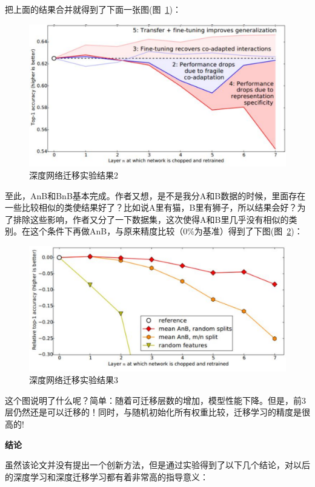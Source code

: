 把上面的结果合并就得到了下面一张图(图~\ref{fig-8-3})：

\begin{figure}[htbp]
	\centering
	\includegraphics[scale=0.5]{figures/fig-8_2.pdf}
	\caption{深度网络迁移实验结果2}
	\label{fig-8-3}
\end{figure}

至此，AnB和BnB基本完成。作者又想，是不是我分A和B数据的时候，里面存在一些比较相似的类使结果好了？比如说A里有猫，B里有狮子，所以结果会好？为了排除这些影响，作者又分了一下数据集，这次使得A和B里几乎没有相似的类别。在这个条件下再做AnB，与原来精度比较（0\%为基准）得到了下图(图~\ref{fig-8-4})：

\begin{figure}[htbp]
	\centering
	\includegraphics[scale=0.5]{./figures/fig-8_3.pdf}
	\caption{深度网络迁移实验结果3}
	\label{fig-8-4}
\end{figure}

这个图说明了什么呢？简单：随着可迁移层数的增加，模型性能下降。但是，前3层仍然还是可以迁移的！同时，与随机初始化所有权重比较，迁移学习的精度是很高的!

\textbf{结论}

虽然该论文并没有提出一个创新方法，但是通过实验得到了以下几个结论，对以后的深度学习和深度迁移学习都有着非常高的指导意义：

